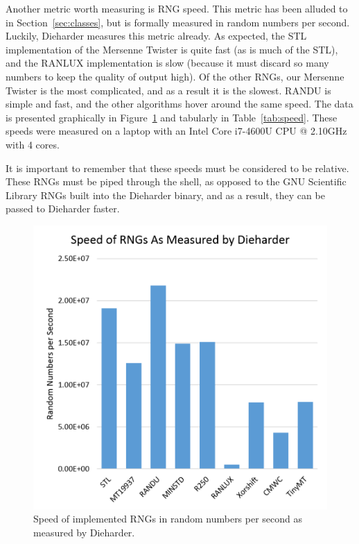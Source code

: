 

Another metric worth measuring is RNG speed. This metric has been alluded to in Section~\ref{sec:classes}, but is formally measured in random numbers per second. Luckily, Dieharder measures this metric already. As expected, the STL implementation of the Mersenne Twister is quite fast (as is much of the STL), and the RANLUX implementation is slow (because it must discard so many numbers to keep the quality of output high). Of the other RNGs, our Mersenne Twister is the most complicated, and as a result it is the slowest. RANDU is simple and fast, and the other algorithms hover around the same speed. The data is presented graphically in Figure~\ref{fig:speed} and tabularly in Table~\ref{tab:speed}. These speeds were measured on a laptop with an Intel Core i7-4600U CPU @ 2.10GHz with 4 cores.

It is important to remember that these speeds must be considered to be relative. These RNGs must be piped through the shell, as opposed to the GNU Scientific Library RNGs built into the Dieharder binary, and as a result, they can be passed to Dieharder faster.

\begin{figure}[tb]
    \begin{center}
        \includegraphics[width=\linewidth]{figures/speed.png}
    \end{center}
    \caption{Speed of implemented RNGs in random numbers per second as measured by Dieharder.}
    \label{fig:speed}
\end{figure}

